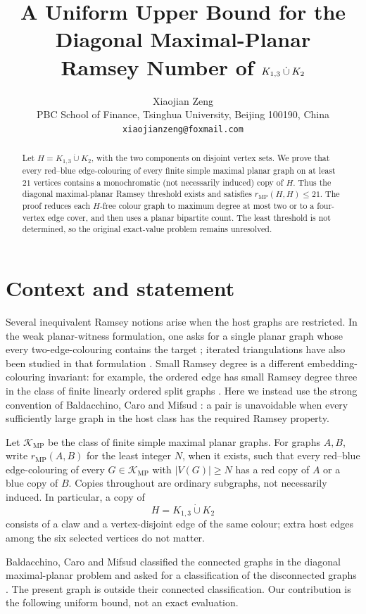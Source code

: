 \documentclass[11pt]{article}
\title{A Uniform Upper Bound for the Diagonal Maximal-Planar\\
Ramsey Number of $K_{1,3}\sqcupdot K_2$}
\author{Xiaojian Zeng\\
\small PBC School of Finance, Tsinghua University, Beijing 100190, China\\
\small \texttt{xiaojianzeng@foxmail.com}}
\date{}
\newcommand{\MP}{\mathrm{MP}}
\newcommand{\cK}{\mathcal{K}}
\newcommand{\sqcupdot}{\mathbin{\dot\cup}}
\begin{document}
\maketitle

\begin{abstract}
Let $H=K_{1,3}\sqcupdot K_2$, with the two components on disjoint
vertex sets.  We prove that every red--blue edge-colouring of every finite
simple maximal planar graph on at least $21$ vertices contains a
monochromatic (not necessarily induced) copy of $H$.  Thus the diagonal
maximal-planar Ramsey threshold exists and satisfies
$r_{\MP}(H,H)\leq 21$.  The proof reduces each $H$-free colour graph to
maximum degree at most two or to a four-vertex edge cover, and then uses a
planar bipartite count.  The least threshold is not determined, so the
original exact-value problem remains unresolved.
\end{abstract}

\section{Context and statement}

Several inequivalent Ramsey notions arise when the host graphs are
restricted.  In the weak planar-witness formulation, one asks for a single
planar graph whose every two-edge-colouring contains the target
\cite{AxenovichEtAl2019}; iterated triangulations have also been studied in
that formulation \cite{MaTangYu2020}.  Small Ramsey degree is a different
embedding-colouring invariant: for example, the ordered edge has small
Ramsey degree three in the class of finite linearly ordered split graphs
\cite{Zeng2026SmallRamsey}.  Here we instead use the strong convention of
Baldacchino, Caro and Mifsud \cite{BaldacchinoCaroMifsud2026}: a pair is
unavoidable when every sufficiently large graph in the host class has the
required Ramsey property.

Let $\cK_{\MP}$ be the class of finite simple maximal planar graphs.  For
graphs $A,B$, write $r_{\MP}(A,B)$ for the least integer $N$, when it
exists, such that every red--blue edge-colouring of every
$G\in\cK_{\MP}$ with $|V(G)|\geq N$ has a red copy of $A$ or a blue copy
of $B$.  Copies throughout are ordinary subgraphs, not necessarily induced.
In particular, a copy of
\[
H=K_{1,3}\sqcupdot K_2
\]
consists of a claw and a vertex-disjoint edge of the same colour; extra host
edges among the six selected vertices do not matter.

Baldacchino, Caro and Mifsud classified the connected graphs in the
diagonal maximal-planar problem and asked for a classification of the
disconnected graphs \cite[Theorem~2 and Problem~2]{BaldacchinoCaroMifsud2026}.
The present graph is outside their connected classification.  Our contribution
is the following uniform bound, not an exact evaluation.
\end{document}
